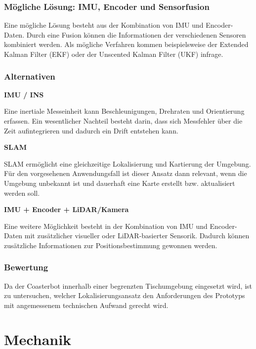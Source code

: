 \documentclass[
  a4paper,
  12pt,
  DIV=12,        %
  parskip=half,  %
  headings=small %
]{scrartcl}
\theoremstyle{definition}
\theoremstyle{definition}
\begin{document}
\subsubsection{Mögliche Lösung: IMU, Encoder und
Sensorfusion}\label{muxf6gliche-luxf6sung-imu-encoder-und-sensorfusion}

Eine mögliche Lösung besteht aus der Kombination von IMU und
Encoder-Daten. Durch eine Fusion können die Informationen der
verschiedenen Sensoren kombiniert werden. Als mögliche Verfahren kommen
beispielsweise der Extended Kalman Filter (EKF) oder der Unscented
Kalman Filter (UKF) infrage.

\subsubsection{Alternativen}\label{alternativen-4}

\textbf{IMU / INS}

Eine inertiale Messeinheit kann Beschleunigungen, Drehraten und
Orientierung erfassen. Ein wesentlicher Nachteil besteht darin, dass
sich Messfehler über die Zeit aufintegrieren und dadurch ein Drift
entstehen kann.

\textbf{SLAM}

SLAM ermöglicht eine gleichzeitige Lokalisierung und Kartierung der
Umgebung. Für den vorgesehenen Anwendungsfall ist dieser Ansatz dann
relevant, wenn die Umgebung unbekannt ist und dauerhaft eine Karte
erstellt bzw. aktualisiert werden soll.

\textbf{IMU + Encoder + LiDAR/Kamera}

Eine weitere Möglichkeit besteht in der Kombination von IMU und
Encoder-Daten mit zusätzlicher visueller oder LiDAR-basierter Sensorik.
Dadurch können zusätzliche Informationen zur Positionsbestimmung
gewonnen werden.

\subsubsection{Bewertung}\label{bewertung-4}

Da der Coasterbot innerhalb einer begrenzten Tischumgebung eingesetzt
wird, ist zu untersuchen, welcher Lokalisierungsansatz den Anforderungen
des Prototyps mit angemessenem technischen Aufwand gerecht wird.

\section{Mechanik}\label{mechanik}
\end{document}

